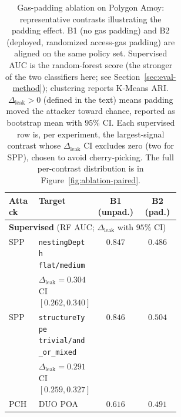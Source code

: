 \begin{table}[t]
  \centering
  \caption{Gas-padding ablation on Polygon Amoy: representative contrasts illustrating the
    padding effect. B1 (no gas padding) and B2 (deployed, randomized access-gas padding) are
    aligned on the same policy set. Supervised AUC is the random-forest score (the stronger
    of the two classifiers here; see Section~\ref{sec:eval-method}); clustering reports K-Means ARI.
    $\Delta_{\text{leak}}>0$ (defined in the text) means padding moved the attacker toward chance,
    reported as bootstrap mean with $95\%$ CI. Each supervised row is, per experiment, the
    largest-signal contrast whose $\Delta_{\text{leak}}$ CI excludes zero (two for SPP), chosen to
    avoid cherry-picking. The full per-contrast distribution is in Figure~\ref{fig:ablation-paired}.}
  \label{tab:ablation-gas-padding}
  \begin{tabular}{lp{0.34\linewidth}cc}
    \toprule
    Attack & Target & B1 (unpad.) & B2 (pad.) \\
    \midrule
    \multicolumn{4}{l}{\textbf{Supervised} (RF AUC; $\Delta_{\text{leak}}$ with $95\%$ CI)} \\
    SPP   & \texttt{nestingDepth flat/medium}   & $0.847$ & $0.486$ \\
          & \quad $\Delta_{\text{leak}}=0.304$ CI$[0.262,0.340]$ & & \\
    SPP   & \texttt{structureType trivial/and\_or\_mixed} & $0.846$ & $0.504$ \\
          & \quad $\Delta_{\text{leak}}=0.291$ CI$[0.259,0.327]$ & & \\
    PCH   & DUO POA                          & $0.616$ & $0.491$ \\

\end{tabular}
\end{table}
